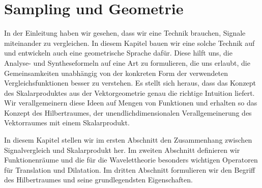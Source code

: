 %
%
%
\chapter{Sampling und Geometrie
\label{chapter:geometrie}}
In der Einleitung haben wir gesehen, dass wir eine Technik brauchen,
Signale miteinander zu vergleichen.
In diesem Kapitel bauen wir eine solche Technik auf und entwickeln
auch eine geometrische Sprache dafür.
Diese hilft uns, die Analyse- und Syntheseformeln auf eine Art zu formulieren,
die uns erlaubt, die Gemeinsamkeiten unabhängig von der konkreten Form
der verwendeten Vergleichsfunktionen besser zu verstehen.
Es stellt sich heraus, dass das Konzept des Skalarproduktes aus der
Vektorgeometrie genau die richtige Intuition liefert.
Wir verallgemeinern diese Ideen auf Mengen von Funktionen
und erhalten so das Konzept des Hilbertraumes, der unendlichdimensionalen 
Verallgemeinerung des Vektorraumes mit einem Skalarprodukt.

In diesem Kapitel stellen wir im ersten Abschnitt den Zusammenhang
zwischen Signalvergleich und Skalarprodukt her.
Im zweiten Abschnitt definieren wir Funktionenräume und die für
die Wavelettheorie besonders wichtigen Operatoren für Translation und
Dilatation.
Im dritten Abschnitt formulieren wir den Begriff des Hilbertraumes
und seine grundlegendsten Eigenschaften.





